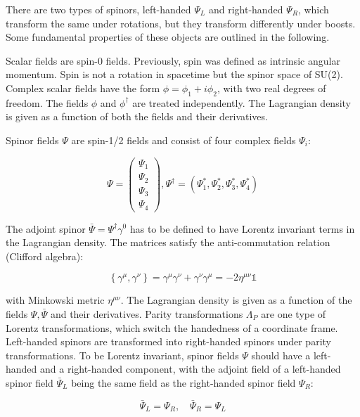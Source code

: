 There are two types of spinors, left-handed $\Psi_{L}$ and right-handed $\Psi_{R}$, which transform the same under rotations, but they transform differently under boosts. Some fundamental properties of these objects are outlined in the following.

Scalar fields are spin-0 fields. Previously, spin was defined as intrinsic angular momentum. Spin is not a rotation in spacetime but the spinor space of SU(2). Complex scalar fields have the form $\phi=\phi_{1}+i \phi_{2}$, with two real degrees of freedom. The fields $\phi$ and $\phi^{\dagger}$ are treated independently. The Lagrangian density is given as a function of both the fields and their derivatives.

Spinor fields $\Psi$ are spin-1/2 fields and consist of four complex fields $\Psi_{i}$:

\begin{equation}
  \Psi=\left(\begin{array}{l}
  \Psi_{1} \\
  \Psi_{2} \\
  \Psi_{3} \\
  \Psi_{4}
  \end{array}\right), \Psi^{\dagger}=(\Psi_{1}^{*}, \Psi_{2}^{*}, \Psi_{3}^{*}, \Psi_{4}^{*})
\end{equation}

The adjoint spinor $\bar{\Psi}=\Psi^{\dagger} \gamma^{0}$ has to be defined to have Lorentz invariant terms in the Lagrangian density. The matrices satisfy the anti-commutation relation (Clifford algebra):

\begin{equation}
  \left\{\gamma^{\mu}, \gamma^{\nu}\right\}=\gamma^{\mu} \gamma^{\nu}+\gamma^{\nu} \gamma^{\mu}=-2 \eta^{\mu \nu} \mathbb{1}
\end{equation}

with Minkowski metric $\eta^{\mu \nu}$. The Lagrangian density is given as a function of the fields $\Psi, \bar{\Psi}$ and their derivatives. Parity transformations $\Lambda_{P}$ are one type of Lorentz transformations, which switch the handedness of a coordinate frame. Left-handed spinors are transformed into right-handed spinors under parity transformations. To be Lorentz invariant, spinor fields $\Psi$ should have a left-handed and a right-handed component, with the adjoint field of a left-handed spinor field $\bar{\Psi}_{L}$ being the same field as the right-handed spinor field $\Psi_{R}$:

\begin{equation}
  \bar{\Psi}_{L}=\Psi_{R}, \quad \bar{\Psi}_{R}=\Psi_{L}
\end{equation}

